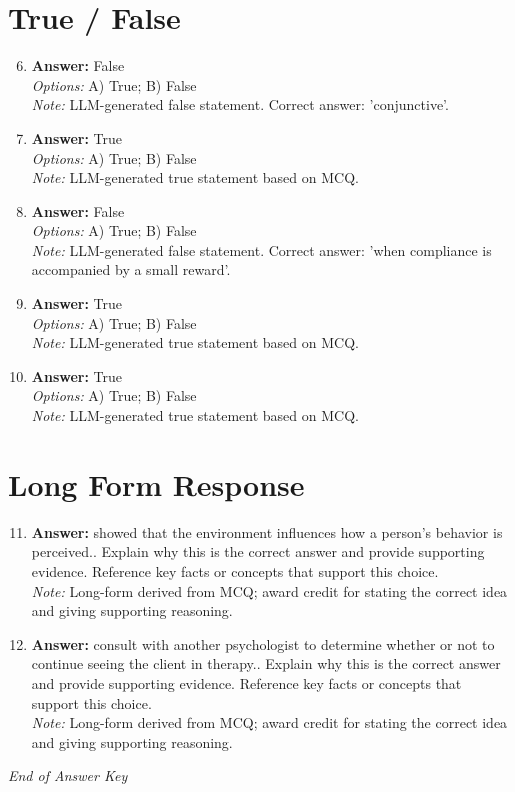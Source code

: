 \documentclass[12pt]{article}
\begin{document}
\section*{True / False}
\begin{enumerate}[label=\arabic*.]
\setcounter{enumi}{5}
\item \textbf{Answer:} False
\\ \textit{Options:} A) True; B) False
\\ \textit{Note:} LLM-generated false statement. Correct answer: 'conjunctive'.
\item \textbf{Answer:} True
\\ \textit{Options:} A) True; B) False
\\ \textit{Note:} LLM-generated true statement based on MCQ.
\item \textbf{Answer:} False
\\ \textit{Options:} A) True; B) False
\\ \textit{Note:} LLM-generated false statement. Correct answer: 'when compliance is accompanied by a small reward'.
\item \textbf{Answer:} True
\\ \textit{Options:} A) True; B) False
\\ \textit{Note:} LLM-generated true statement based on MCQ.
\item \textbf{Answer:} True
\\ \textit{Options:} A) True; B) False
\\ \textit{Note:} LLM-generated true statement based on MCQ.
\end{enumerate}

\section*{Long Form Response}
\begin{enumerate}[label=\arabic*.]
\setcounter{enumi}{10}
\item \textbf{Answer:} showed that the environment inﬂuences how a person's behavior is perceived.. Explain why this is the correct answer and provide supporting evidence. Reference key facts or concepts that support this choice.
\\ \textit{Note:} Long-form derived from MCQ; award credit for stating the correct idea and giving supporting reasoning.
\item \textbf{Answer:} consult with another psychologist to determine whether or not to continue seeing the client in therapy.. Explain why this is the correct answer and provide supporting evidence. Reference key facts or concepts that support this choice.
\\ \textit{Note:} Long-form derived from MCQ; award credit for stating the correct idea and giving supporting reasoning.
\end{enumerate}

\vfill
\noindent\textit{End of Answer Key}
\end{document}

